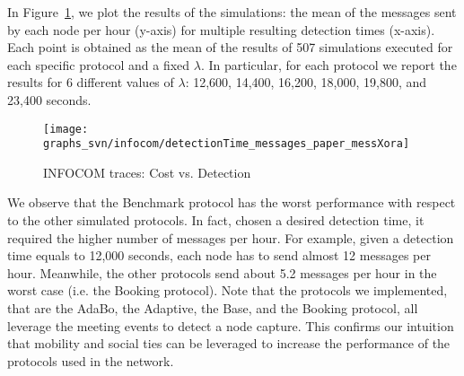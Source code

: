 \documentclass{IEEEconf}
\begin{document}
In Figure~\ref{fig:infocom_detectTime_messages}, we plot the results of the simulations: the mean of the messages sent by each node per hour (y-axis) for multiple resulting detection times (x-axis). Each point is obtained as the mean of the results of 507 simulations executed for each specific protocol and a fixed $\lambda$. In particular, for each protocol we report the results for 6 different values of $\lambda$: 12,600, 14,400, 16,200, 18,000, 19,800, and 23,400 seconds.

\begin{figure}[hbt]
\begin{center}
	\texttt{[image: graphs\_svn/infocom/detectionTime\_messages\_paper\_messXora]}
\end{center}
\caption{INFOCOM traces: Cost vs. Detection}
\label{fig:infocom_detectTime_messages}
\end{figure}

We observe that the Benchmark protocol has the worst performance with respect to the other simulated protocols. In fact, chosen a desired detection time, it required the higher number of messages per hour. For example, given a detection time equals to 12,000 seconds, each node has to send almost 12 messages per hour. Meanwhile, the other protocols send about 5.2 messages per hour in the worst case (i.e. the Booking protocol). Note that the protocols we implemented, that are the AdaBo, the Adaptive, the Base, and the Booking protocol, all leverage the meeting events to detect a node capture. This confirms our intuition that mobility and
social ties can be leveraged to increase the performance of the protocols used in the network.
\end{document}

